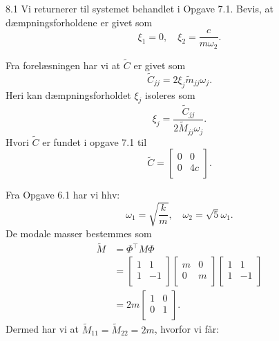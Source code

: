
\begin{problem}{8.1}
  Vi returnerer til systemet behandlet i Opgave 7.1. Bevis, at dæmpningsforholdene er givet som
  \[ 
  \xi_1 = 0, \quad \xi_2 = \frac{c}{m \omega_2}
  .\]
\end{problem}

\begin{derivation}
  Fra forelæsningen har vi at $\tilde{C}$ er givet som
  \[ 
  \tilde{C}_{jj} = 2 \xi_{j} \tilde{m}_{jj} \omega_j
  .\]
  Heri kan dæmpningsforholdet $\xi_{j}$ isoleres som
  \[ 
  \xi_{j} = \frac{\tilde{C}_{jj}}{2 \tilde{M}_{jj} \omega_j}
  .\]
  Hvori $\tilde{C}$ er fundet i opgave 7.1 til
  \[ 
  \tilde{C} = \begin{bmatrix}
  0 & 0\\
  0 & 4c\\
  \end{bmatrix}
  .\]
  
  Fra Opgave 6.1 har vi hhv:
  \[ 
  \omega_1 = \sqrt{\frac{k}{m}}, \quad \omega_2 = \sqrt{5}\omega_1
  .\]
  De modale masser bestemmes som
  \begin{align*}
    \tilde{M} &= \Phi^{\intercal} M \Phi \\
              &= \begin{bmatrix}
              1 & 1\\
              1 & -1\\
              \end{bmatrix} \begin{bmatrix}
              m & 0\\
              0 & m\\
              \end{bmatrix} \begin{bmatrix}
              1 & 1\\
              1 & -1\\
              \end{bmatrix} \\
              &= 2m \begin{bmatrix}
              1 & 0\\
              0 & 1\\
              \end{bmatrix}
  .\end{align*} 
  Dermed har vi at $\tilde{M}_{11} = \tilde{M}_{22} = 2m$, hvorfor vi får:
\end{derivation}


